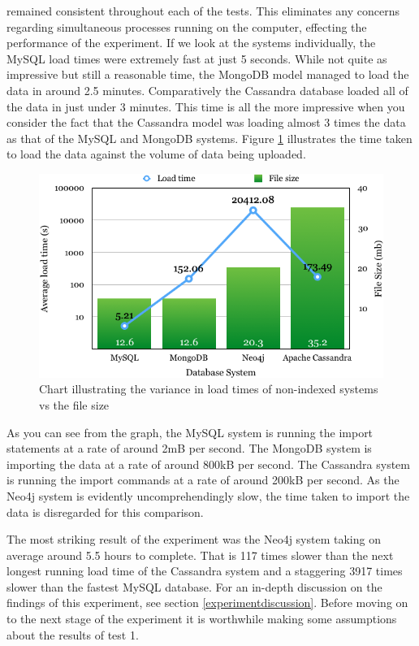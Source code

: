 \parindent 0pt
remained consistent throughout each of the tests. This eliminates any concerns regarding simultaneous processes running on the computer, effecting the performance of the experiment.
\parindent 15pt
If we look at the systems individually, the MySQL load times were extremely fast at just 5 seconds. While not quite as impressive but still a reasonable time, the MongoDB model managed to load the data in around 2.5 minutes. Comparatively the Cassandra database loaded all of the data in just under 3 minutes. This time is all the more impressive when you consider the fact that the Cassandra model was loading almost 3 times the data as that of the MySQL and MongoDB systems. Figure \ref{fig:loadvsfile} illustrates the time taken to load the data against the volume of data being uploaded.
\begin{figure}[H]\begin{center}\includegraphics[width=1\linewidth]{images/loadvsfile}\caption{Chart illustrating the variance in load times of non-indexed systems vs the file size}\label{fig:loadvsfile}\end{center}\end{figure}

As you can see from the graph, the MySQL system is running the import statements at a rate of around 2mB per second. The MongoDB system is importing the data at a rate of around 800kB per second. The Cassandra system is running the import commands at a rate of around 200kB per second. As the Neo4j system is evidently uncomprehendingly slow, the time taken to import the data is disregarded for this comparison.

The most striking result of the experiment was the Neo4j system taking on average around 5.5 hours to complete. That is 117 times slower than the next longest running load time of the Cassandra system and a staggering 3917 times slower than the fastest MySQL database. For an in-depth discussion on the findings of this experiment, see section \ref{experimentdiscussion}. Before moving on to the next stage of the experiment it is worthwhile making some assumptions about the results of test 1.

